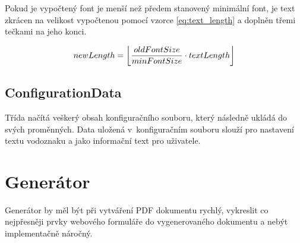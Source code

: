 Pokud je vypočtený font je menší než předem stanovený minimální font, je text zkrácen na velikost vypočtenou pomocí vzorce  \eqref{eq:text_length} a doplněn třemi tečkami na jeho konci. 

\begin{equation}
newLength = \floor*{\frac{oldFontSize}{minFontSize} \cdot textLength} \label{eq:text_length}
\end{equation}
\subsection{ConfigurationData}
Třída načítá veškerý obsah konfiguračního souboru, který následně ukládá do svých proměnných. Data uložená v~konfiguračním souboru slouží pro nastavení textu vodoznaku a jako informační text pro uživatele.
\section{Generátor}
Generátor by měl být při vytváření PDF dokumentu rychlý, vykreslit co nejpřesněji prvky webového formuláře do vygenerovaného dokumentu a nebýt implementačně náročný.
